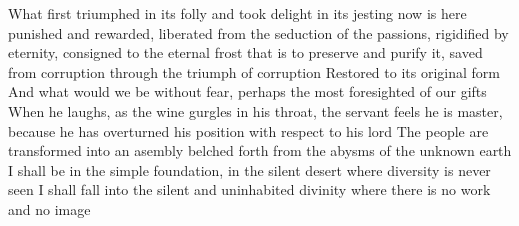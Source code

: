 \documentclass{article}
\begin{document}
What first triumphed in its folly and took delight in its jesting now is here punished and rewarded, liberated from the seduction of the passions, rigidified by eternity, consigned to the eternal frost that is to preserve and purify it, saved from corruption through the triumph of corruption
Restored to its original form
And what would we be without fear, perhaps the most foresighted of our gifts
When he laughs, as the wine gurgles in his throat, the servant feels he is master, because he has overturned his position with respect to his lord
The people are transformed into an asembly belched forth from the abysms of the unknown earth
I shall be in the simple foundation, in the silent desert where diversity is never seen
I shall fall into the silent and uninhabited divinity where there is no work and no image
\fi
\end{document}
